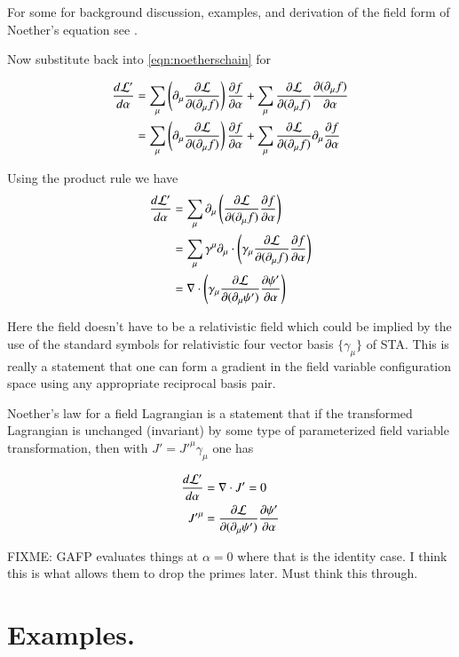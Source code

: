 \documentclass{article}
\begin{document}
For some 
for background discussion, examples, and derivation of the field form of Noether's equation see
\cite{PJFieldLagrangian}.

Now substitute back into \ref{eqn:noetherschain} for

\begin{align*}
\frac{d\mathcal{L}'}{d\alpha}
&= 
\sum_\mu \left( \partial_\mu \frac{\partial {\mathcal{L}}}{\partial {(\partial_\mu f)}}\right)
\frac{\partial {f}}{\partial {\alpha}} + \sum_\mu \frac{\partial {\mathcal{L}}}{\partial {(\partial_\mu f)}}\frac{\partial {(\partial_\mu f)}}{\partial {\alpha}} \\
&= 
\sum_\mu \left( \partial_\mu \frac{\partial {\mathcal{L}}}{\partial {(\partial_\mu f)}} \right)
\frac{\partial {f}}{\partial {\alpha}} + \sum_\mu \frac{\partial {\mathcal{L}}}{\partial {(\partial_\mu f)}} \partial_\mu \frac{\partial {f}}{\partial {\alpha}} \\
\end{align*}

Using the product rule we have
\begin{align*}
\frac{d\mathcal{L}'}{d\alpha}
&= \sum_\mu \partial_\mu \left( \frac{\partial {\mathcal{L}}}{\partial {(\partial_\mu f)}} \frac{\partial {f}}{\partial {\alpha}} \right) \\
&= \sum_\mu \gamma^\mu \partial_\mu \cdot \left( \gamma_\mu \frac{\partial {\mathcal{L}}}{\partial {(\partial_\mu f)}} \frac{\partial {f}}{\partial {\alpha}} \right) \\
&= \nabla \cdot \left( \gamma_\mu \frac{\partial {\mathcal{L}}}{\partial {(\partial_\mu \psi')}} \frac{\partial {\psi'}}{\partial {\alpha}} \right) \\
\end{align*}

Here the field doesn't have to be a relativistic field which could be implied by the use of the standard
symbols for relativistic four vector
basis $\{\gamma_\mu\}$ of STA.
This is really a statement that one can form a gradient in the field variable configuration space
using any appropriate reciprocal basis pair.

Noether's law for a field Lagrangian is a statement that if the transformed Lagrangian is unchanged (invariant) by
some type of parameterized field variable transformation, then with $J' = {J'}^\mu \gamma_\mu$ one has

\begin{align}
\frac{d\mathcal{L}'}{d\alpha} &= \nabla \cdot J' = 0 \\
{J'}^\mu &= \frac{\partial {\mathcal{L}}}{\partial {(\partial_\mu \psi')}} \frac{\partial {\psi'}}{\partial {\alpha}} 
\end{align}

FIXME: GAFP evaluates things at $\alpha = 0$ where that is the identity case.  I think this is what allows them to drop the primes later.  Must think
this through.

\section{ Examples. }
\end{document}
